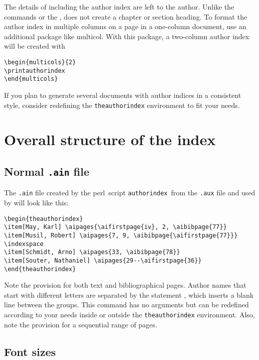 \documentclass[a4paper]{article}
\newcommand{\package}[1]{\textsf{#1}}
\newcommand{\perl}{\textsf{perl}}
\newcommand{\file}[1]{\texttt{#1}}
\newcommand{\fnext}[1]{\file{.#1}}
\newcommand{\cmdline}[1]{\texttt{#1}}
\newcommand{\aiperl}{\cmdline{authorindex}}
\newcommand{\ltxinp}[1]{\texttt{\string#1}}
\begin{document}
The details of including the author index are left to the author.  Unlike the
commands \ltxinp{\printindex} or the \ltxinp{\thebibliography},
\ltxinp{\printauthorindex} does not create a chapter or section heading. To
format the author index in multiple columns on a page in a one-column document,
use an additional package like \package{multicol}.  With this package, a
two-column author index will be created with
\begin{verbatim}
\begin{multicols}{2}
\printauthorindex
\end{multicols}
\end{verbatim}
If you plan to generate several documents with author indices in a consistent
style, consider redefining the \ltxinp{theauthorindex} environment to fit your
needs.


\section{Overall structure of the index}

\subsection{Normal \fnext{ain} file}

The \fnext{ain} file created by the \perl\ script \aiperl\ from the \fnext{aux}
file and used by \ltxinp{\printauthorindex} will look like this:
\begin{verbatim}
\begin{theauthorindex}
\item[May, Karl] \aipages{\aifirstpage{iv}, 2, \aibibpage{77}}
\item[Musil, Robert] \aipages{7, 9, \aibibpage{\aifirstpage{77}}}
\indexspace
\item[Schmidt, Arno] \aipages{33, \aibibpage{78}}
\item[Souter, Nathaniel] \aipages{29--\aifirstpage{36}}
\end{theauthorindex}
\end{verbatim}
Note the provision for both text and bibliographical pages. Author names that
start with different letters are separated by the statement
\ltxinp{\indexspace}, which inserts a blank line between the groups. This
command has no arguments but can be redefined according to your needs inside or
outside the \ltxinp{theauthorindex} environment. Also, note the provision for a
sequential range of pages.


\subsection{Font sizes}
\end{document}
